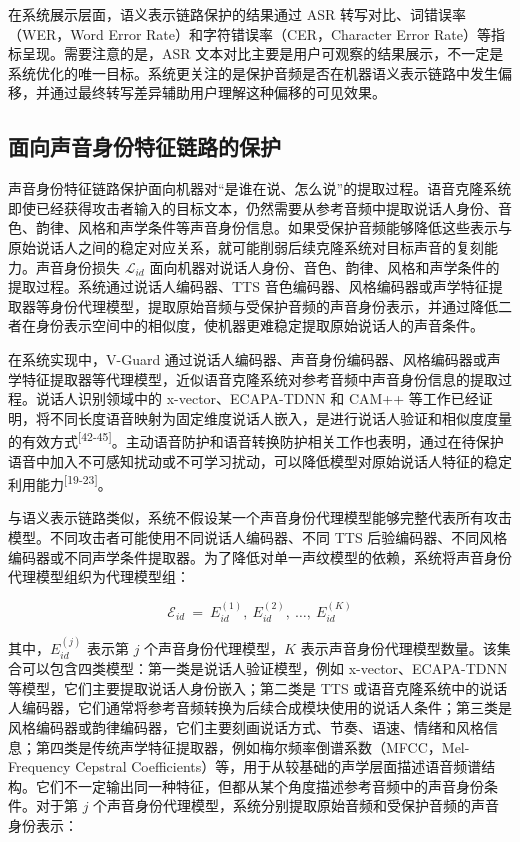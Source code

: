 在系统展示层面，语义表示链路保护的结果通过 ASR
转写对比、词错误率（WER，Word Error Rate）和字符错误率（CER，Character
Error Rate）等指标呈现。需要注意的是，ASR
文本对比主要是用户可观察的结果展示，不一定是系统优化的唯一目标。系统更关注的是保护音频是否在机器语义表示链路中发生偏移，并通过最终转写差异辅助用户理解这种偏移的可见效果。

\subsection{面向声音身份特征链路的保护}\label{ux9762ux5411ux58f0ux97f3ux8eabux4efdux7279ux5f81ux94feux8defux7684ux4fddux62a4}

声音身份特征链路保护面向机器对``是谁在说、怎么说''的提取过程。语音克隆系统即使已经获得攻击者输入的目标文本，仍然需要从参考音频中提取说话人身份、音色、韵律、风格和声学条件等声音身份信息。如果受保护音频能够降低这些表示与原始说话人之间的稳定对应关系，就可能削弱后续克隆系统对目标声音的复刻能力。声音身份损失
\(\mathcal{L}_{id}\)
面向机器对说话人身份、音色、韵律、风格和声学条件的提取过程。系统通过说话人编码器、TTS
音色编码器、风格编码器或声学特征提取器等身份代理模型，提取原始音频与受保护音频的声音身份表示，并通过降低二者在身份表示空间中的相似度，使机器更难稳定提取原始说话人的声音条件。

在系统实现中，V-Guard
通过说话人编码器、声音身份编码器、风格编码器或声学特征提取器等代理模型，近似语音克隆系统对参考音频中声音身份信息的提取过程。说话人识别领域中的
x-vector、ECAPA-TDNN 和 CAM++
等工作已经证明，将不同长度语音映射为固定维度说话人嵌入，是进行说话人验证和相似度度量的有效方式\textsuperscript{{[}42-45{]}}。主动语音防护和语音转换防护相关工作也表明，通过在待保护语音中加入不可感知扰动或不可学习扰动，可以降低模型对原始说话人特征的稳定利用能力\textsuperscript{{[}19-23{]}}。

与语义表示链路类似，系统不假设某一个声音身份代理模型能够完整代表所有攻击模型。不同攻击者可能使用不同说话人编码器、不同
TTS
后验编码器、不同风格编码器或不同声学条件提取器。为了降低对单一声纹模型的依赖，系统将声音身份代理模型组织为代理模型组：

\[\mathcal{E}_{id}\  = \ E_{id}^{(1)},\ E_{id}^{(2)},\ \ldots,\ E_{id}^{(K)}\]

其中，\(E_{id}^{(j)}\) 表示第 \(j\) 个声音身份代理模型，\(K\)
表示声音身份代理模型数量。该集合可以包含四类模型：第一类是说话人验证模型，例如
x-vector、ECAPA-TDNN 等模型，它们主要提取说话人身份嵌入；第二类是 TTS
或语音克隆系统中的说话人编码器，它们通常将参考音频转换为后续合成模块使用的说话人条件；第三类是风格编码器或韵律编码器，它们主要刻画说话方式、节奏、语速、情绪和风格信息；第四类是传统声学特征提取器，例如梅尔频率倒谱系数（MFCC，Mel-Frequency
Cepstral
Coefficients）等，用于从较基础的声学层面描述语音频谱结构。它们不一定输出同一种特征，但都从某个角度描述参考音频中的声音身份条件。对于第
\(j\)
个声音身份代理模型，系统分别提取原始音频和受保护音频的声音身份表示：

